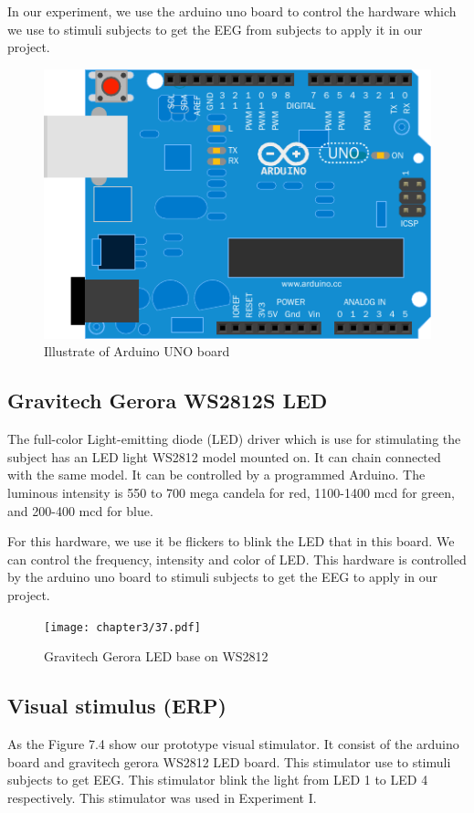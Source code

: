 In our experiment, we use the arduino uno board to control the hardware which we use to stimuli subjects to get the EEG from subjects to apply it in our project.
\begin{figure}[ht]
	\centering
	\includegraphics[scale = 0.8]{chapter3/38.pdf}
	\caption{Illustrate of Arduino UNO board}
\end{figure}

\subsection{Gravitech Gerora WS2812S LED}
\hspace{1.5cm} The full-color Light-emitting diode (LED) driver which is use for stimulating the subject has an LED light WS2812 model mounted on. It can chain connected with the same model. It can be controlled by a programmed Arduino. The luminous intensity is 550 to 700 mega candela for red, 1100-1400 mcd for green, and 200-400 mcd for blue.

For this hardware, we use it be flickers to blink the LED that in this board. We can control the frequency, intensity and color of LED. This hardware is controlled by the arduino uno board to stimuli subjects to get the EEG to apply in our project.
\begin{figure}[ht]
	\centering
	\texttt{[image: chapter3/37.pdf]}
	\caption{Gravitech Gerora LED base on WS2812}
\end{figure}

\subsection{Visual stimulus (ERP)}
\hspace{1.5cm} As the Figure 7.4 show our prototype visual stimulator. It consist of the arduino board and gravitech gerora WS2812 LED board. This stimulator use to stimuli subjects to get EEG. This stimulator blink the light from LED 1 to LED 4 respectively. This stimulator was used in Experiment I.

